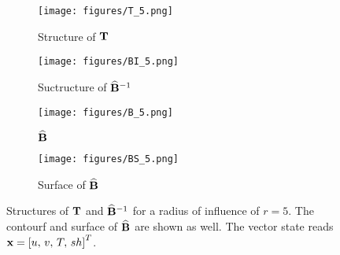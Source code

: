 \documentclass[12pt]{article}
\newcommand{\T}{{\bf T}}
\newcommand{\BEST}{\widehat{\bf B}}
\begin{document}
\begin{figure}[htp]
\centering
\begin{subfigure}{0.45\textwidth}
\centering
\texttt{[image: figures/T\_5.png]}
\caption{Structure of $\T$}
\label{fig:structure-of-T}
\end{subfigure}\begin{subfigure}{0.45\textwidth}
\centering
\texttt{[image: figures/BI\_5.png]}
\caption{Suctructure of $\BEST^{-1}$}
\label{fig:structure-of-B-inv}
\end{subfigure}

\begin{subfigure}{0.45\textwidth}
\centering
\texttt{[image: figures/B\_5.png]}
\caption{$\BEST$}
\label{fig:BEST}
\end{subfigure}\begin{subfigure}{0.45\textwidth}
\centering
\texttt{[image: figures/BS\_5.png]}
\caption{Surface of $\BEST$}
\label{fig:BEST-waves}
\end{subfigure}
\caption{Structures of $\T$ and $\BEST^{-1}$ for a radius of influence of $r=5$. The contourf and surface of $\BEST$ are shown as well. The vector state reads ${\bf x} = \left [ u,\, v,\, T,\, sh \right ]^T$.}
\label{fig:local-structure}
\end{figure}
\end{document}
